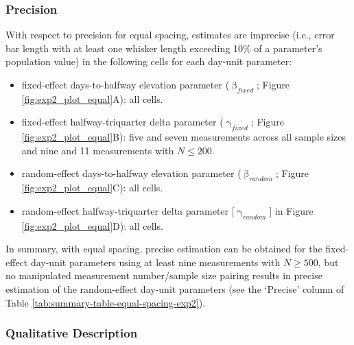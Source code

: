 \documentclass[
12pt, %
twoside,
english]{guelphthesis}
\begin{document}
\hypertarget{precision-equal-exp2}{%
\subsubsection{Precision}\label{precision-equal-exp2}}

With respect to precision for equal spacing, estimates are imprecise (i.e., error bar length with at least one whisker length exceeding 10\% of a parameter's population value) in the following cells for each day-unit parameter:
\begin{itemize}
\tightlist
\item
  fixed-effect days-to-halfway elevation parameter (\(\upbeta_{fixed}\); Figure \ref{fig:exp2_plot_equal}A): all cells.
\item
  fixed-effect halfway-triquarter delta parameter (\(\upgamma_{fixed}\); Figure \ref{fig:exp2_plot_equal}B): five and seven measurements across all sample sizes and nine and 11 measurements with \(N \le 200\).
\item
  random-effect days-to-halfway elevation parameter (\(\upbeta_{random}\); Figure \ref{fig:exp2_plot_equal}C): all cells.
\item
  random-effect halfway-triquarter delta parameter {[}\(\upgamma_{random}\){]} in Figure \ref{fig:exp2_plot_equal}D): all cells.
\end{itemize}
In summary, with equal spacing, precise estimation can be obtained for the fixed-effect day-unit parameters using at least nine measurements with \(N \ge 500\), but no manipulated measurement number/sample size pairing results in precise estimation of the random-effect day-unit parameters (see the `Precise' column of Table \ref{tab:summary-table-equal-spacing-exp2}).

\hypertarget{qualitative-equal-exp2}{%
\subsubsection{Qualitative Description}\label{qualitative-equal-exp2}}
\end{document}
